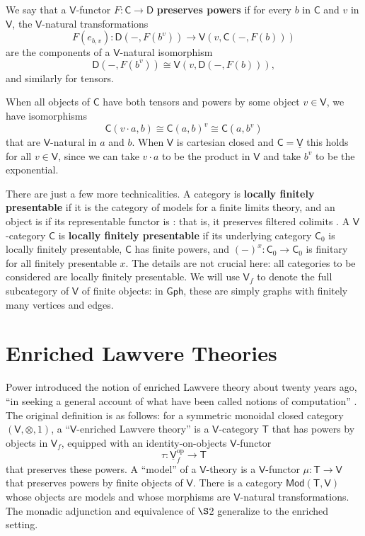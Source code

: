 \documentclass{amsart}
\newcommand{\define}[1]{{\bf \boldmath{#1}}}
\theoremstyle{definition}
\newcommand{\Gph}{\mathsf{Gph}}
\newcommand{\Mod}{\mathsf{Mod}}
\newcommand{\V}{\mathsf{V}}
\newcommand{\D}{\mathsf{D}}
\newcommand{\C}{\mathsf{C}}
\newcommand{\T}{\mathsf{T}}
\newcommand{\op}{\mathrm{op}}
\newcommand{\maps}{\colon}
\begin{document}
We say that a $\V$-functor $F\maps \C\to \D$ \textbf{preserves powers} if for every $b$ in $\C$ and $v$ in $\V$, the $\V$-natural transformations
\[     F(e_{b,v}) \maps \D(-,F(b^v)) \to \V(v,\C(-,F(b)))   \]
are the components of a $\V$-natural isomorphism 
\[           \D(-,F(b^v)) \cong \V(v,\D(-,F(b))), \]
and similarly for tensors.


When all objects of $\C$ have both tensors and powers by some object $v \in \V$, we have isomorphisms
\[
	\C(v\cdot a,b) \cong \C(a,b)^v \cong \C(a, b^v)
\]
that are $\V$-natural in $a$ and $b$.  When $\V$ is cartesian closed and $\C = \underline{\V}$
this holds for all $v \in \V$, since we can take $v \cdot a$ to be the product in $\V$ and take
$b^v$ to be the exponential.


There are just a few more technicalities. A category is \textbf{locally finitely presentable} if it is the category of models for a finite limits theory, and an object is \define{finite} if its representable functor is \define{finitary}: that is, it preserves filtered colimits \cite{adamekrosicky}.   A $\V$-category $\C$ is \textbf{locally finitely presentable} if its underlying category $\C_0$ is locally finitely presentable, $\C$ has finite powers, and $(-)^x\maps \C_0 \to \C_0$ is finitary for all finitely presentable $x$.  The details are not crucial here: all categories to be considered are locally finitely presentable. We will use  $\V_f$ to denote the full subcategory of $\V$ of finite objects: in $\Gph$, these are simply graphs with finitely many vertices and edges.

\section{Enriched Lawvere Theories}
\label{sec:enriched_lawvere}

Power introduced the notion of enriched Lawvere theory about twenty years ago, ``in seeking a general account of what have been called notions of computation'' \cite{power}. The original definition is as follows: for a symmetric monoidal closed category $(\V,\otimes,1)$, a ``$\V$-enriched Lawvere theory'' is a $\V$-category $\T$ that has powers by objects in $\V_f$, equipped with an identity-on-objects $\V$-functor 
\[  \tau\maps \underline{\V}_f^\op \to \T \]
that preserves these powers.  A ``model'' of a $\V$-theory is a $\V$-functor $\mu\maps\T \to \V$ that preserves powers by finite objects of $\V$.  There is a category $\Mod(\T,\V)$ whose objects are models and whose morphisms are $\V$-natural transformations. The monadic adjunction and equivalence of $\S$2 generalize to the enriched setting.
\end{document}
